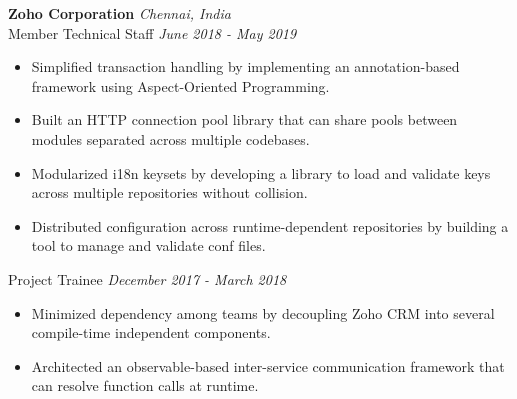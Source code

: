 \documentclass{resume}
\begin{document}
\textbf{Zoho Corporation} \hfill \textit{Chennai, India} \\
{\small Member Technical Staff} \hfill \textit{\small June 2018 - May 2019}
\begin{itemize}
  \item Simplified transaction handling by implementing an annotation-based framework using Aspect-Oriented Programming.
  \item Built an HTTP connection pool library that can share pools between modules separated across multiple codebases.
  \item Modularized i18n keysets by developing a library to load and validate keys across multiple repositories without collision.
  \item Distributed configuration across runtime-dependent repositories by building a tool to manage and validate conf files.
\end{itemize}
{\small Project Trainee} \hfill \textit{\small December 2017 - March 2018}
\begin{itemize}
  \item Minimized dependency among teams by decoupling Zoho CRM into several compile-time independent components.
  \item Architected an observable-based inter-service communication framework that can resolve function calls at runtime.
\end{itemize}
	
\end{document}
